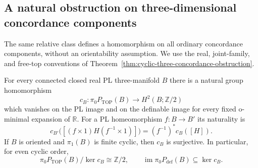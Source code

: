\subsection{A natural obstruction on three-dimensional concordance components}

The same relative class defines a homomorphism on all ordinary
concordance components, without an orientability assumption.
We use the real, joint-family, and free-top conventions of
Theorem~\ref{thm:cyclic-three-concordance-obstruction}.

\begin{theorem}\label{thm:natural-three-concordance-obstruction}
For every connected closed real PL three-manifold $B$ there
is a natural group homomorphism
\begin{equation}\label{eq:natural-three-concordance-class}
 c_B:\pi_0P_{\mathrm{TOP}}(B)\longrightarrow
                         H^2(B;\mathbb Z/2)
\end{equation}
which vanishes on the PL image and on the definable image
for every fixed o-minimal expansion of $\mathbb R$.
For a PL homeomorphism $f:B\to B'$ its naturality is
\begin{equation}\label{eq:three-concordance-typed-naturality}
 c_{B'}\bigl([(f\times1)H(f^{-1}\times1)]\bigr)
                    =(f^{-1})^*c_B([H]).
\end{equation}
If $B$ is oriented and $\pi_1(B)$ is finite cyclic, then
$c_B$ is surjective.  In particular, for even cyclic order,
\[
 \pi_0P_{\mathrm{TOP}}(B)/\ker c_B\cong\mathbb Z/2,
 \qquad
 \operatorname{im}\pi_0P_{\mathrm{def}}(B)\subseteq\ker c_B.
\]
\end{theorem}

